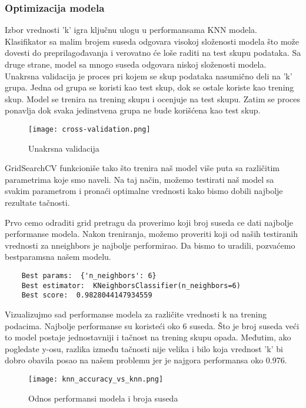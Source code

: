 \documentclass[a4paper,12pt]{article}
\begin{document}
\subsubsection{Optimizacija modela}
Izbor vrednosti 'k' igra ključnu ulogu u performansama KNN modela. Klasifikator sa malim brojem suseda odgovara visokoj složenosti modela što može dovesti do preprilagođavanja i verovatno će loše raditi na test skupu podataka. Sa druge strane, model sa mnogo suseda odgovara niskoj složenosti modela.
Unakrsna validacija je proces pri kojem se skup podataka nasumično deli na 'k' grupa. Jedna od grupa se koristi kao test skup, dok se ostale koriste kao trening skup. Model se trenira na trening skupu i ocenjuje na test skupu. Zatim se proces ponavlja dok svaka jedinstvena grupa ne bude korišćena kao test skup.

\clearpage

\begin{figure}[h!]
\centering
\texttt{[image: cross-validation.png]}
\caption{Unakrsna validacija}
\label{fig:cross_validation}
\end{figure}


GridSearchCV funkcioniše tako što trenira naš model više puta sa različitim parametrima koje smo naveli. Na taj način, možemo testirati naš model sa svakim parametrom i pronaći optimalne vrednosti kako bismo dobili najbolje rezultate tačnosti.

Prvo cemo odraditi grid pretragu da proverimo koji broj suseda ce dati najbolje performanse modela.
Nakon treniranja, možemo proveriti koji od naših testiranih vrednosti za n\textunderscore neighbors je najbolje performirao. Da bismo to uradili, pozvaćemo best\textunderscore params\textunderscore  na našem modelu.

\begin{verbatim}
    Best params:  {'n_neighbors': 6}
    Best estimator:  KNeighborsClassifier(n_neighbors=6)
    Best score:  0.9828044147934559
\end{verbatim}

Vizualizujmo sad performanse modela za različite vrednosti k na trening podacima. Najbolje performanse su koristeći oko 6 suseda. Što je broj suseda veći to model postaje jednostavniji i tačnost na trening skupu opada. Međutim, ako pogledate y-osu, razlika između tačnosti nije velika i bilo koja vrednost 'k' bi dobro obavila posao na našem problemu jer je najgora performansa oko 0.976.

\begin{figure}[h!]
\centering
\texttt{[image: knn\_accuracy\_vs\_knn.png]}
\caption{Odnos performansi modela i broja suseda}
\label{fig:knn_accuracy_vs_knn}
\end{figure}
\end{document}
